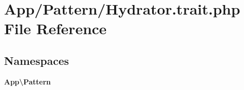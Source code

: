 \section{App/\+Pattern/\+Hydrator.trait.\+php File Reference}
\label{_hydrator_8trait_8php}
\subsection*{Namespaces}
\begin{DoxyCompactItemize}
\item 
 \textbf{ App\textbackslash{}\+Pattern}
\end{DoxyCompactItemize}
